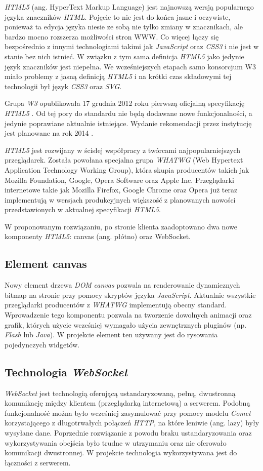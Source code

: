 \emph{HTML5} (ang. HyperText Markup Language) jest najnowszą wersją popularnego języka znaczników \emph{HTML}. Pojęcie to nie jest do końca jasne i oczywiste, ponieważ ta edycja języka niesie ze sobą nie tylko zmiany w znacznikach, ale bardzo mocno rozszerza możliwości stron WWW. Co więcej łączy się bezpośrednio z innymi technologiami takimi jak \emph{JavaScript} oraz \emph{CSS3} i nie jest w stanie bez nich istnieć. W związku z tym sama definicja \emph{HTML5} jako jedynie język znaczników jest niepełna. We wcześniejszych etapach samo konsorcjum W3 miało problemy z jasną definicją \emph{HTML5} i na krótki czas składowymi tej technologii był język \emph{CSS3} oraz \emph{SVG}. \cite{html5games}

Grupa \emph{W3} opublikowała 17 grudnia 2012 roku pierwszą oficjalną specyfikację \emph{HTML5} \cite{html5w3}. Od tej pory do standardu nie będą dodawane nowe funkcjonalności, a jedynie poprawiane aktualnie istniejące. Wydanie rekomendacji przez instytucję jest planowane na rok 2014 \cite{plan2014}.

\emph{HTML5} jest rozwijany w ścisłej współpracy z twórcami najpopularniejszych przeglądarek. Została powołana specjalna grupa \emph{WHATWG} (Web Hypertext Application Technology Working Group), która skupia producentów takich jak Mozilla Foundation, Google, Opera Software oraz Apple Inc. Przeglądarki internetowe takie jak Mozilla Firefox, Google Chrome oraz Opera już teraz implementują w wersjach produkcyjnych większość z planowanych nowości przedstawionych w aktualnej specyfikacji \emph{HTML5}.

W proponowanym rozwiązaniu, po stronie klienta zaadoptowano dwa nowe komponenty \emph{HTML5}: canvas (ang. płótno) oraz WebSocket.

\subsection{Element canvas}
Nowy element drzewa \emph{DOM} \emph{canvas} pozwala na renderowanie dynamicznych bitmap na stronie przy pomocy skryptów języka \emph{JavaScript}. Aktualnie wszystkie przeglądarki producentów z \emph{WHATWG} implementują obecny standard.
Wprowadzenie tego komponentu pozwala na tworzenie dowolnych animacji oraz grafik, których użycie wcześniej wymagało użycia zewnętrznych pluginów (np. \emph{Flash} lub \emph{Java}).
W projekcie element ten używany jest do rysowania pojedynczych widgetów.

\subsection{Technologia \emph{WebSocket}}
\emph{WebSocket} jest technologią oferującą ustandaryzowaną, pełną, dwustronną komunikację między klientem (przeglądarką internetową) a serwerem. Podobną funkcjonalność można było wcześniej zasymulować przy pomocy modelu \emph{Comet} korzystającego z długotrwałych połączeń \emph{HTTP}, na które leniwie (ang. lazy) były wysyłane dane. Poprzednie rozwiązanie z powodu braku ustandaryzowania oraz wykorzystywania obejścia było trudne w utrzymaniu oraz nie oferowało komunikacji dwustronnej.
W projekcie technologia wykorzystywana jest do łączności z serwerem.
